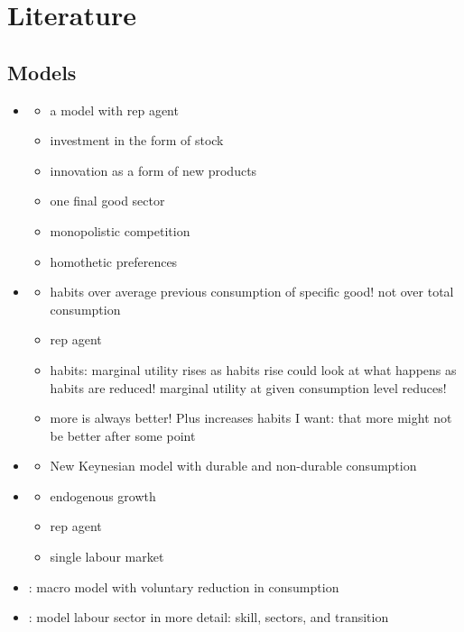 \section{Literature}


\subsection{Models}
\begin{itemize}
\item \cite{Bilbiie2012EndogenousCycles}
\begin{itemize}
\item a model with rep agent
\item investment in the form of stock 
\item innovation as a form of new products
\item one final good sector
\item monopolistic competition
\item homothetic preferences
\end{itemize}
\item \cite{Ravn2006DeepHabits}
\begin{itemize}
 \item habits over average previous consumption of specific good! not over total consumption
 \item rep agent 
 \item habits: marginal utility rises as habits rise \ar could look at what happens as habits are reduced! \ar marginal utility at given consumption level reduces!
 \item more is always better! Plus increases habits \ar I want: that more might not be better after some point
\end{itemize}
\item \cite{McKay2021LumpyPolicy}
\begin{itemize}
\item New Keynesian model with durable and non-durable consumption 
\end{itemize}
\item \cite{Acemoglu2012TheChange}
\begin{itemize}
\item endogenous growth
\item rep agent
\item single labour market
\end{itemize}
\item \cite{Heikkinen2015DegrowthConsumers}: macro model with voluntary reduction in consumption
\item \cite{Borissov2019CarbonDevelopment}: model labour sector in more detail: skill, sectors, and transition
\end{itemize}

